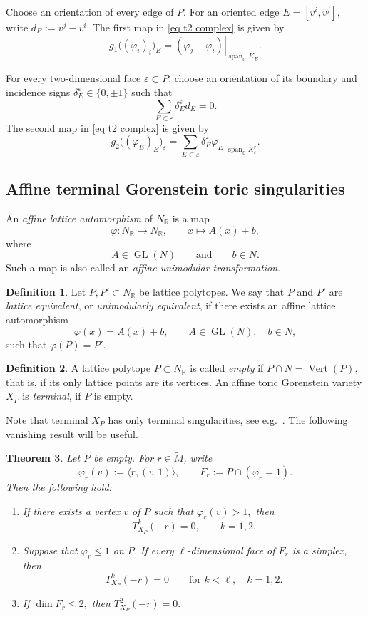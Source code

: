 \documentclass[11pt]{amsart}
\numberwithin{equation}{section}
\theoremstyle{plain}
\newtheorem{theorem}{Theorem}[section]
\theoremstyle{definition}
\newtheorem{definition}[theorem]{Definition}
\newcommand{\0}{$0$-mutable}
\newcommand{\RR}{\ensuremath{\mathbb{R}}}
\newcommand{\CC}{\ensuremath{\mathbb{C}}}
\renewcommand{\1}{$1$-rigid}
\renewcommand{\0}{$0$-mutable}
\begin{document}
Choose an orientation of every edge of \(P\). For an oriented edge
$
E=[v^i,v^j],
$
write
$
d_E:=v^j-v^i.
$
The first map in \eqref{eq t2 complex} is given by
\[
g_1\bigl((\varphi_i)_i\bigr)_E
=
\left.
(\varphi_j-\varphi_i)
\right|_{\operatorname{span}_{\CC}K_E^r}.
\]

For every two-dimensional face \(\varepsilon\subset P\), choose an
orientation of its boundary and incidence signs
$
\delta_E^\varepsilon\in\{0,\pm1\}
$
such that
\[
\sum_{E\subset\varepsilon}
\delta_E^\varepsilon d_E=0.
\]
The second map in \eqref{eq t2 complex} is given by
\[
g_2\bigl((\varphi_E)_E\bigr)_\varepsilon
=
\sum_{E\subset\varepsilon}
\delta_E^\varepsilon
\left.
\varphi_E
\right|_{\operatorname{span}_{\CC}K_\varepsilon^r}.
\]


\subsection{Affine terminal Gorenstein toric singularities}
An \emph{affine lattice automorphism} of \(N_{\mathbb R}\) is a map \[ \varphi\colon N_{\mathbb R}\longrightarrow N_{\mathbb R}, \qquad x\longmapsto A(x)+b, \] where \[ A\in \operatorname{GL}(N) \qquad\text{and}\qquad b\in N. \] Such a map is also called an \emph{affine unimodular transformation}. \begin{definition} Let \(P,P'\subset N_{\mathbb R}\) be lattice polytopes. We say that \(P\) and \(P'\) are \emph{lattice equivalent}, or \emph{unimodularly equivalent}, if there exists an affine lattice automorphism \[ \varphi(x)=A(x)+b, \qquad A\in\operatorname{GL}(N),\quad b\in N, \] such that $\varphi(P)=P'.$ 
\end{definition}


\begin{definition}\label{def emp}
A lattice polytope \(P\subset N_{\RR}\) is called \emph{empty} if
$
P\cap N=\operatorname{Vert}(P),
$
that is, if its only lattice points are its vertices. 
An affine toric Gorenstein variety $X_P$ is \emph{terminal}, if $P$ is empty. 
\end{definition}

Note that terminal $X_P$ has only terminal singularities, see e.g.\ \cite[Proposition 11.4.12]{CLS11}. 
The following vanishing result will be useful.

\begin{theorem}
\label{th AvS comparison}
Let \(P\) be empty. For \(r\in\widetilde M\), write
\[
\varphi_r(v):=\langle r,(v,1)\rangle,
\qquad
F_r:=P\cap(\varphi_r=1).
\]
Then the following hold:
\begin{enumerate}
\item If there exists a vertex \(v\) of \(P\) such that
$
\varphi_r(v)>1,
$
then
\[
T^k_{X_P}(-r)=0,\qquad k=1,2.
\]

\item Suppose that \(\varphi_r\leq1\) on \(P\). If every
\(\ell\)-dimensional face of \(F_r\) is a simplex, then
\[
T^k_{X_P}(-r)=0
\qquad\text{for } k<\ell,\quad k=1,2.
\]

\item If
$
\dim F_r\leq2,
$
then
$
T^2_{X_P}(-r)=0.
$
\end{enumerate}
\end{theorem}
\end{document}
